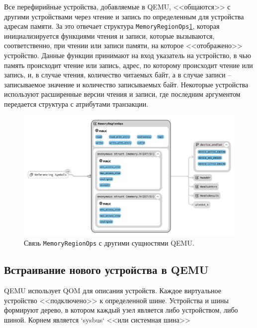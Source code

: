 
Все перефирийные устройства, добавляемые в QEMU, <<общаются>> с другими устройствами через чтение и запись
по определенным для устройства адресам памяти.
За это отвечает структура \texttt{MemoryRegionOps}\cref{fig:mem-reg-ops},
которая инициализируется функциями чтения и записи,
которые вызываются, соответственно, при чтении или записи памяти, на которое <<отображено>> устройство.
Данные функции принимают на вход указатель на устройство, в чью память происходит чтение или запись,
адрес, по которому происходит чтение или запись, и, в случае чтения, количество читаемых байт,
а в случае записи -- записываемое значение и количество записываемых байт.
Некоторые устройства используют расширенные версии чтения и записи, где последним аргументом передается
структура с атрибутами транзакции.

\begin{figure}[!htbp]
    \centering
    \begin{adjustbox}{max totalsize={\textwidth}{\textheight}}
        \includegraphics[]{images/mem_reg_ops_cropped.png}
    \end{adjustbox}
    \caption{Связь \texttt{MemoryRegionOps} с другими сущностями QEMU.}\label{fig:mem-reg-ops}
\end{figure}


\subsection{Встраивание нового устройства в QEMU}\label{sec:ch1/sec4/sub2/sub4}

QEMU использует QOM для описания устройств. Каждое виртуальное устройство <<подключено>> к определенной
шине. Устройства и шины формируют дерево, в котором каждый узел является либо устройством, либо
шиной. Корнем является `sysbus` <<или системная шина>>

